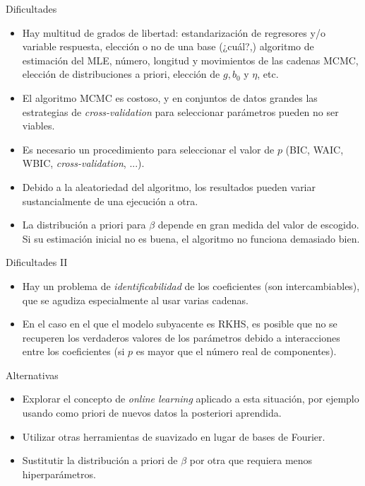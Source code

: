 \documentclass[10pt, spanish, professionalfonts]{beamer}
\begin{document}
\begin{frame}{Dificultades}
  \begin{itemize}


  \item Hay multitud de grados de libertad: estandarización de regresores y/o variable respuesta, elección o no de una base (¿cuál?,) algoritmo de estimación del MLE, número, longitud y movimientos de las cadenas MCMC, elección de distribuciones a priori, elección de \(g, b_0\) y \(\eta\), etc.
  \item El algoritmo MCMC es costoso, y en conjuntos de datos grandes las estrategias de \textit{cross-validation} para seleccionar parámetros pueden no ser viables.
  \item Es necesario un procedimiento para seleccionar el valor de \(p\) (BIC, WAIC, WBIC, \textit{cross-validation}, ...).
  \item Debido a la aleatoriedad del algoritmo, los resultados pueden variar sustancialmente de una ejecución a otra.
  \item La distribución a priori para \(\beta\) depende en gran medida del valor de  escogido. Si su estimación inicial no es buena, el algoritmo no funciona demasiado bien.
\end{itemize}
\end{frame}

\begin{frame}{Dificultades II}
  \begin{itemize}
    \item Hay un problema de \textit{identificabilidad} de los coeficientes (son intercambiables), que se agudiza especialmente al usar varias cadenas.
    \item En el caso en el que el modelo subyacente es RKHS, es posible que no se recuperen los verdaderos valores de los parámetros debido a interacciones entre los coeficientes (si \(p\) es mayor que el número real de componentes).
  \end{itemize}
\end{frame}

\begin{frame}{Alternativas}
  \begin{itemize}
    \item Explorar el concepto de \textit{online learning} aplicado a esta situación, por ejemplo usando como priori de nuevos datos la posteriori aprendida.
    \item Utilizar otras herramientas de suavizado en lugar de bases de Fourier.
    \item Sustitutir la distribución a priori de \(\beta\) por otra que requiera menos hiperparámetros.
  \end{itemize}

\end{frame}
\end{document}
